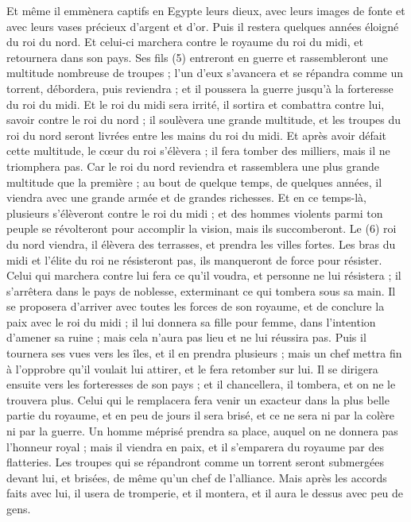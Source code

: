 \begin{multicols}{2}
Et même il emmènera captifs en Egypte leurs dieux, avec leurs images de fonte et avec leurs vases précieux d'argent et d'or.  Puis il restera quelques années éloigné du roi du nord.
Et celui-ci marchera contre le royaume du roi du  midi, et retournera dans son pays.
Ses fils (5)  entreront en guerre et rassembleront une multitude nombreuse de troupes ; l'un d'eux s’avancera et se répandra comme un torrent,  débordera, puis reviendra ; et il poussera la guerre jusqu'à la forteresse du roi du midi.
Et le roi du midi sera irrité, il sortira et combattra contre lui, savoir contre le roi du nord ; il soulèvera une grande multitude, et les troupes du roi du nord seront livrées entre les mains du roi du midi.
Et après avoir défait cette multitude, le cœur du roi s’élèvera ; il fera tomber des milliers, mais il ne triomphera pas.
Car le roi du nord reviendra et rassemblera une plus grande multitude que la première ; au bout de quelque temps, de quelques années, il viendra avec une grande armée et de grandes richesses.
Et en ce temps-là, plusieurs s'élèveront contre le roi du midi ; et des hommes violents parmi ton peuple se révolteront pour accomplir la vision, mais ils succomberont.
Le (6) roi du nord viendra, il élèvera des terrasses, et prendra les villes fortes.  Les bras du midi et l’élite du roi ne résisteront pas, ils manqueront de force pour résister.
Celui qui marchera contre lui fera ce qu’il voudra, et personne ne lui résistera ; il s’arrêtera dans le pays de noblesse, exterminant ce qui tombera sous sa main.
Il se proposera d’arriver avec toutes les forces de son royaume, et de conclure la paix avec le roi du midi ; il lui donnera sa fille pour femme, dans l’intention d’amener sa ruine ; mais cela n’aura pas lieu et ne lui réussira pas.
Puis il tournera ses vues vers les îles, et il en prendra plusieurs ; mais un chef mettra fin à l'opprobre qu'il voulait lui attirer, et le fera retomber sur lui.
Il se dirigera ensuite vers les forteresses de son pays ; et il chancellera, il tombera, et on ne le trouvera plus.
Celui qui le remplacera fera venir un exacteur dans la plus belle partie du royaume, et en peu de jours il sera brisé, et ce ne sera ni par la colère ni par la guerre.
Un homme méprisé prendra sa place, auquel on ne donnera pas l'honneur royal ; mais il viendra en paix, et il s’emparera du royaume par des flatteries.
Les troupes qui se répandront comme un torrent seront submergées devant lui, et brisées, de même qu’un chef de l’alliance.
Mais après les accords faits avec lui, il usera de tromperie, et il montera, et il aura le dessus avec peu de gens.

\end{multicols}
